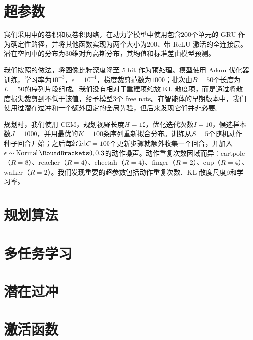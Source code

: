 \section{超参数}
\label{sec:hparams}

我们采用\citet{ha2018worldmodels}中的卷积和反卷积网络，在动力学模型中使用包含$200$个单元的 GRU \citep{cho2014gru}作为确定性路径，并将其他函数实现为两个大小为$200$、带 ReLU 激活的全连接层\citep{nair2010relu}。潜在空间中的分布为$30$维对角高斯分布，其均值和标准差由模型预测。

我们按照\citet{kingma2018glow}的做法，将图像比特深度降至 5 bit 作为预处理。模型使用 Adam 优化器训练\citep{kingma2014adam}，学习率为$10^{-3}$，$\epsilon=10^{-4}$，梯度裁剪范数为$1000$；批次由$B=50$个长度为$L=50$的序列片段组成。我们没有相对于重建项缩放 KL 散度项，而是通过将散度损失裁剪到不低于该值，给予模型$3$个 free nats。在智能体的早期版本中，我们使用过潜在过冲和一个额外固定的全局先验，但后来发现它们并非必要。

规划时，我们使用 CEM，规划视野长度$H=12$，优化迭代次数$I=10$，候选样本数$J=1000$，并用最优的$K=100$条序列重新拟合分布。训练从$S=5$个随机动作种子回合开始；之后每经过$C=100$个更新步骤就额外收集一个回合，并加入$\epsilon\sim\Normal(0,0.3)$的动作噪声。动作重复次数因域而异：cartpole（$R=8$）、reacher（$R=4$）、cheetah（$R=4$）、finger（$R=2$）、cup（$R=4$）、walker（$R=2$）。我们发现重要的超参数包括动作重复次数、KL 散度尺度$\beta$和学习率。

\section{规划算法}


\clearpage
\section{多任务学习}
\label{sec:exp_multi}



\clearpage
\section{潜在过冲}
\label{sec:exp_overshooting}


\clearpage
\section{激活函数}
\label{sec:exp_activation}


